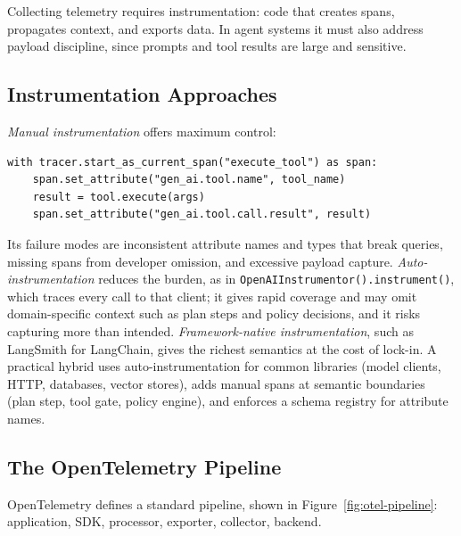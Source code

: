 \documentclass[11pt]{book}
\begin{document}
Collecting telemetry requires instrumentation: code that creates spans, propagates context, and exports data. In agent systems it must also address payload discipline, since prompts and tool results are large and sensitive.

\subsection{Instrumentation Approaches}

\textit{Manual instrumentation} offers maximum control:
\begin{verbatim}
with tracer.start_as_current_span("execute_tool") as span:
    span.set_attribute("gen_ai.tool.name", tool_name)
    result = tool.execute(args)
    span.set_attribute("gen_ai.tool.call.result", result)
\end{verbatim}
Its failure modes are inconsistent attribute names and types that break queries, missing spans from developer omission, and excessive payload capture. \textit{Auto-instrumentation} reduces the burden, as in \texttt{OpenAIInstrumentor().instrument()}, which traces every call to that client; it gives rapid coverage and may omit domain-specific context such as plan steps and policy decisions, and it risks capturing more than intended. \textit{Framework-native instrumentation}, such as LangSmith for LangChain, gives the richest semantics at the cost of lock-in. A practical hybrid uses auto-instrumentation for common libraries (model clients, HTTP, databases, vector stores), adds manual spans at semantic boundaries (plan step, tool gate, policy engine), and enforces a schema registry for attribute names.

\subsection{The OpenTelemetry Pipeline}

OpenTelemetry defines a standard pipeline, shown in Figure~\ref{fig:otel-pipeline}: application, SDK, processor, exporter, collector, backend.
\end{document}
